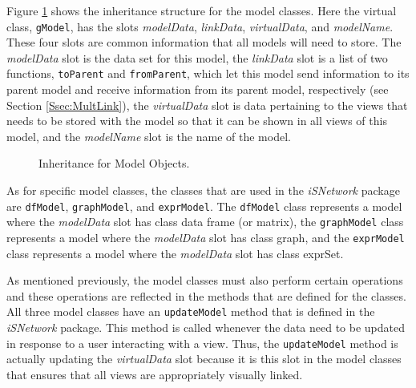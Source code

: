 \documentclass{article}[11pt]
\newcommand{\Rfunction}[1]{{\texttt{#1}}}
\newcommand{\Robject}[1]{{\texttt{#1}}}
\newcommand{\Rpackage}[1]{{\textit{#1}}}
\newcommand{\Rslot}[1]{\textsl{#1}}
\begin{document}
Figure \ref{Fig:Model} shows the inheritance structure for the model classes.
Here the virtual class, \Robject{gModel}, has the slots \Rslot{modelData},
\Rslot{linkData}, \Rslot{virtualData}, and \Rslot{modelName}.  These four
slots are common information that all models will need to store.  The
\Rslot{modelData} slot is the data set for this model, the \Rslot{linkData}
slot is a list of two functions, \Rfunction{toParent} and
\Rfunction{fromParent}, which let this model send information to its parent
model and receive information from its parent model, respectively (see Section
\ref{Ssec:MultLink}), the \Rslot{virtualData} slot is data pertaining to the
views that needs to be stored with the model so that it can be shown in all
views of this model, and the \Rslot{modelName} slot is the name of the model. 


\begin{figure}[ht]
  \begin{center}
    \caption{ Inheritance for Model Objects. }
    \label{Fig:Model}
  \end{center}
\end{figure}

As for specific model classes, the classes that are used in the
\Rpackage{iSNetwork} package are \Robject{dfModel}, \Robject{graphModel},
and \Robject{exprModel}.  The \Robject{dfModel} class represents a model where
the \Rslot{modelData} slot has class data frame (or matrix), the
\Robject{graphModel} class represents a model where the \Rslot{modelData} slot
has class graph, and the \Robject{exprModel} class represents a model where the
\Rslot{modelData} slot has class exprSet. 

As mentioned previously, the model classes must also perform certain
operations and these operations are reflected in the methods that are defined
for the classes.  All three model classes have an \Rfunction{updateModel}
method that is defined in the \Rpackage{iSNetwork} package.  This method is
called whenever the data need to be updated in response to a user interacting
with a view.  Thus, the \Rfunction{updateModel} method is actually updating the
\Rslot{virtualData} slot because it is this slot in the model classes that
ensures that all views are appropriately visually linked.  
\end{document}
